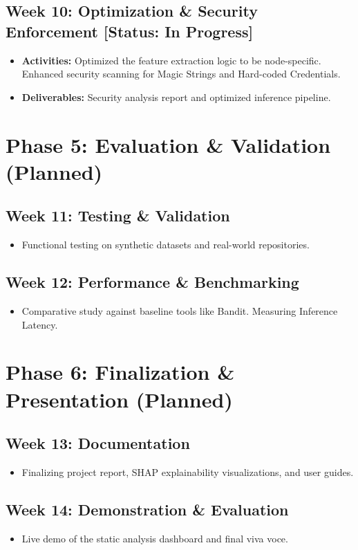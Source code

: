 \documentclass[12pt,a4paper]{article}
\begin{document}
\subsection*{Week 10: Optimization \& Security Enforcement [Status: In Progress]}
\begin{itemize}[noitemsep,topsep=0pt]
    \item \textbf{Activities:} Optimized the feature extraction logic to be node-specific. Enhanced security scanning for Magic Strings and Hard-coded Credentials.
    \item \textbf{Deliverables:} Security analysis report and optimized inference pipeline.
\end{itemize}

\section{Phase 5: Evaluation \& Validation (Planned)}

\subsection*{Week 11: Testing \& Validation}
\begin{itemize}[noitemsep,topsep=0pt]
    \item Functional testing on synthetic datasets and real-world repositories.
\end{itemize}

\subsection*{Week 12: Performance \& Benchmarking}
\begin{itemize}[noitemsep,topsep=0pt]
    \item Comparative study against baseline tools like Bandit. Measuring Inference Latency.
\end{itemize}

\section{Phase 6: Finalization \& Presentation (Planned)}

\subsection*{Week 13: Documentation}
\begin{itemize}[noitemsep,topsep=0pt]
    \item Finalizing project report, SHAP explainability visualizations, and user guides.
\end{itemize}

\subsection*{Week 14: Demonstration \& Evaluation}
\begin{itemize}[noitemsep,topsep=0pt]
    \item Live demo of the static analysis dashboard and final viva voce.
\end{itemize}
\end{document}
